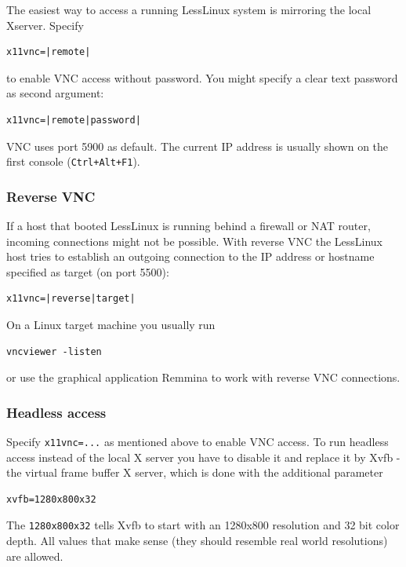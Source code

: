 The easiest way to access a running LessLinux system is mirroring the local Xserver. Specify

\begin{verbatim}
x11vnc=|remote|
\end{verbatim}

to enable VNC access without password. You might specify a clear text password as second argument:

\begin{verbatim}
x11vnc=|remote|password|
\end{verbatim}

VNC uses port 5900 as default. The current IP address is usually shown on the first console (\texttt{Ctrl+Alt+F1}). 

\subsubsection{Reverse VNC}

If a host that booted LessLinux is running behind a firewall or NAT router, incoming connections might not be possible. With reverse VNC the LessLinux host tries to establish an outgoing connection to the IP address or hostname specified as target (on port 5500):

\begin{verbatim}
x11vnc=|reverse|target|
\end{verbatim}

On a Linux target machine you usually run 

\begin{verbatim}
vncviewer -listen
\end{verbatim}

or use the graphical application Remmina to work with reverse VNC connections.

\subsubsection{Headless access}
 
Specify \texttt{x11vnc=...} as mentioned above to enable VNC access. To run headless access instead of the local X server you have to disable it and replace it by Xvfb - the virtual frame buffer X server, which is done with the additional parameter 

\begin{verbatim}
xvfb=1280x800x32
\end{verbatim}
 
The \texttt{1280x800x32} tells Xvfb to start with an 1280x800 resolution and 32 bit color depth. All values that make sense (they should resemble real world resolutions) are allowed.

